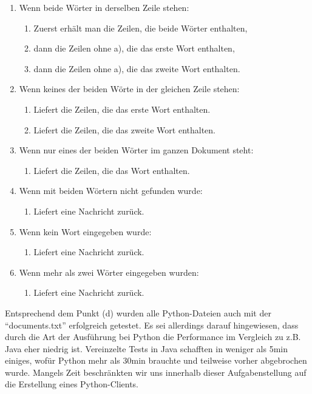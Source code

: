 \documentclass[
     11pt,         %
     a4paper,      %
     oneside,
     ]{article}
\begin{document}
\begin{enumerate}
	\item Wenn beide Wörter in derselben Zeile stehen:
	\begin{enumerate}
		\item Zuerst erhält man die Zeilen, die beide Wörter enthalten,
		\item dann die Zeilen ohne a), die das erste Wort enthalten,
		\item dann die Zeilen ohne a), die das zweite Wort enthalten.
	\end{enumerate}
	\item Wenn keines der beiden Wörte in der gleichen Zeile stehen:
	\begin{enumerate}
		\item Liefert die Zeilen, die das erste Wort enthalten.
		\item Liefert die Zeilen, die das zweite Wort enthalten.
	\end{enumerate}
	\item Wenn nur eines der beiden Wörter im ganzen Dokument steht:
	\begin{enumerate}
		\item Liefert die Zeilen, die das Wort enthalten.
	\end{enumerate}
	\item Wenn mit beiden Wörtern nicht gefunden wurde:
	\begin{enumerate}
		\item Liefert eine Nachricht zurück.
	\end{enumerate}
	\item Wenn kein Wort eingegeben wurde:
	\begin{enumerate}
		\item Liefert eine Nachricht zurück.
	\end{enumerate}
	\item Wenn mehr als zwei Wörter eingegeben wurden:
	\begin{enumerate}
		\item Liefert eine Nachricht zurück.
	\end{enumerate}
\end{enumerate}

Entsprechend dem Punkt (d) wurden alle Python-Dateien auch mit der “documents.txt” erfolgreich getestet.\newline
\newline
Es sei allerdings darauf hingewiesen, dass durch die Art der Ausführung bei Python die Performance im Vergleich zu z.B. Java eher niedrig ist. Vereinzelte Tests in Java schafften in weniger als 5min einiges, wofür Python mehr als 30min brauchte und teilweise vorher abgebrochen wurde. Mangels Zeit beschränkten wir uns innerhalb dieser Aufgabenstellung auf die Erstellung eines Python-Clients.
\end{document}
